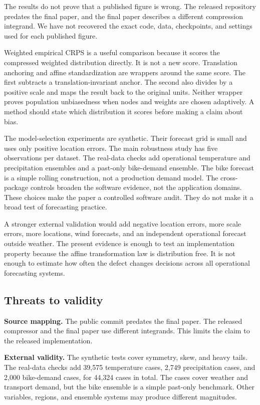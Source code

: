 \documentclass[11pt]{article}
\begin{document}
The results do not prove that a published figure is wrong. The released repository predates the final paper, and the final paper describes a different compression integrand. We have not recovered the exact code, data, checkpoints, and settings used for each published figure.

Weighted empirical CRPS is a useful comparison because it scores the compressed weighted distribution directly. It is not a new score. Translation anchoring and affine standardization are wrappers around the same score. The first subtracts a translation-invariant anchor. The second also divides by a positive scale and maps the result back to the original units. Neither wrapper proves population unbiasedness when nodes and weights are chosen adaptively. A method should state which distribution it scores before making a claim about bias.

The model-selection experiments are synthetic. Their forecast grid is small and uses only positive location errors. The main robustness study has five observations per dataset. The real-data checks add operational temperature and precipitation ensembles and a past-only bike-demand ensemble. The bike forecast is a simple rolling construction, not a production demand model. The cross-package controls broaden the software evidence, not the application domains. These choices make the paper a controlled software audit. They do not make it a broad test of forecasting practice.

A stronger external validation would add negative location errors, more scale errors, more locations, wind forecasts, and an independent operational forecast outside weather. The present evidence is enough to test an implementation property because the affine transformation law is distribution free. It is not enough to estimate how often the defect changes decisions across all operational forecasting systems.

\subsection*{Threats to validity}

\textbf{Source mapping.} The public commit predates the final paper. The released compressor and the final paper use different integrands. This limits the claim to the released implementation.

\textbf{External validity.} The synthetic tests cover symmetry, skew, and heavy tails. The real-data checks add 39,575 temperature cases, 2,749 precipitation cases, and 2,000 bike-demand cases, for 44,324 cases in total. The cases cover weather and transport demand, but the bike ensemble is a simple past-only benchmark. Other variables, regions, and ensemble systems may produce different magnitudes.
\end{document}
